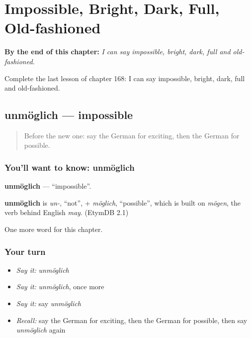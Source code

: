 
\chapter{Impossible, Bright, Dark, Full, Old-fashioned}
\label{ch:ge-impossible-bright-dark-full-old-fashioned}

\begin{chapteropening}
\textbf{By the end of this chapter:} \emph{I can say impossible, bright, dark, full and old-fashioned.}

Complete the last lesson of chapter 168: I can say impossible, bright, dark, full and old-fashioned.
\end{chapteropening}

\section[unmöglich]{unmöglich — impossible}

\label{lesson:GE-C168-unmoeglich}



\begin{quote}
Before the new one: say the German for exciting, then the German for possible.
\end{quote}

\subsection*{You'll want to know: unmöglich}
\textbf{unmöglich} — \textquotedblleft{}impossible\textquotedblright{}.

\begin{cousinweb}
\textbf{unmöglich} is \emph{un-}, \textquotedblleft{}not\textquotedblright{}, + \emph{möglich}, \textquotedblleft{}possible\textquotedblright{}, which is built on \emph{mögen}, the verb behind English \emph{may}. (EtymDB 2.1)
\end{cousinweb}

\begin{grammarlens}[title={What you've built}]
One more word for this chapter.
\end{grammarlens}

\subsection*{Your turn}
\begin{itemize}
\raggedright
  \item \emph{Say it:} \emph{unmöglich}
  \item \emph{Say it:} \emph{unmöglich}, once more
  \item \emph{Say it:} say \emph{unmöglich}
  \item \emph{Recall:} say the German for exciting, then the German for possible, then say \emph{unmöglich} again
\end{itemize}

